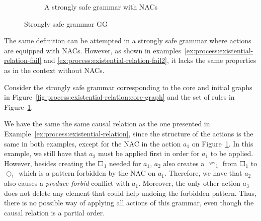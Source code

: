 \begin{example}
\begin{figure}[!ht]
\begin{subfigure}[t]{.5\textwidth}
    \caption{A strongly safe grammar with NACs}\label{fig:process:existential-relation:example-nacs}
  \end{subfigure}
  \caption{Strongly safe grammar GG}\label{fig:process:existential-relation}
\end{figure}
\end{example}

The same definition can be attempted in a strongly safe grammar where actions are equipped with NACs. However, as shown in examples~\ref{ex:process:existential-relation-fail} and \ref{ex:process:existential-relation-fail2}, it lacks the same properties as in the context without NACs.

\begin{example}\label{ex:process:existential-relation-fail}Consider the strongly safe grammar corresponding to the core and initial graphs in Figure~\ref{fig:process:existential-relation:core-graph} and the set of rules in Figure~\ref{fig:process:existential-relation:example-nacs}. 

  We have the same the same causal relation as the one presented in Example~\ref{ex:process:existential-relation}, since the structure of the actions is the same in both examples, except for the NAC in the action $a_1$ on Figure~\ref{fig:process:existential-relation:example-nacs}. In this example, we still have that $a_2$ must be applied first in order for $a_1$ to be applied. However, besides creating the $\Square_1$ needed for $a_1$, $a_2$ also creates a $\curvearrowleft_1$ from $\Square_1$ to $\Circle_1$ which is a pattern forbidden by the NAC on $a_1$. Therefore, we have that $a_2$ also causes a \emph{produce-forbid} conflict with $a_1$. Moreover, the only other action $a_3$ does not delete any element that could help undoing the forbidden pattern. Thus, there is no possible way of applying all actions of this grammar, even though the causal relation is a partial order.

\end{example}

